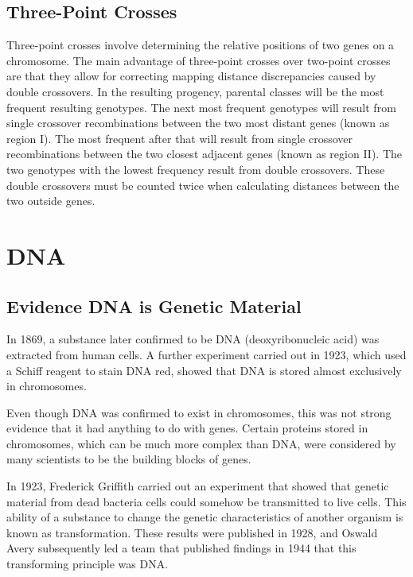\documentclass[12pt,titlepage]{article}
\begin{document}
      \subsection{Three-Point Crosses}
        Three-point crosses involve determining the relative positions of two genes on a chromosome. The main advantage of three-point crosses over two-point
        crosses are that they allow for correcting mapping distance discrepancies caused by double crossovers. In the resulting progency, parental classes
        will be the most frequent resulting genotypes. The next most frequent genotypes will result from single crossover recombinations between the two most
        distant genes (known as region I). The most frequent after that will result from single crossover recombinations between the two closest adjacent
        genes (known as region II). The two genotypes with the lowest frequency result from double crossovers. These double crossovers must be counted twice
        when calculating distances between the two outside genes.

    \section{DNA}

      \subsection{Evidence DNA is Genetic Material}
        In 1869, a substance later confirmed to be DNA (deoxyribonucleic acid) was extracted from human cells. A further experiment carried out in 1923, which
        used a Schiff reagent to stain DNA red, showed that DNA is stored almost exclusively in chromosomes.

        Even though DNA was confirmed to exist in chromosomes, this was not strong evidence that it had anything to do with genes. Certain proteins stored in
        chromosomes, which can be much more complex than DNA, were considered by many scientists to be the building blocks of genes.

        In 1923, Frederick Griffith carried out an experiment that showed that genetic material from dead bacteria cells could somehow be transmitted to live cells. 
        This ability of a substance to change the genetic characteristics of another organism is known as transformation. These results were published in 1928, and
        Oswald Avery subsequently led a team that published findings in 1944 that this transforming principle was DNA.
\end{document}
